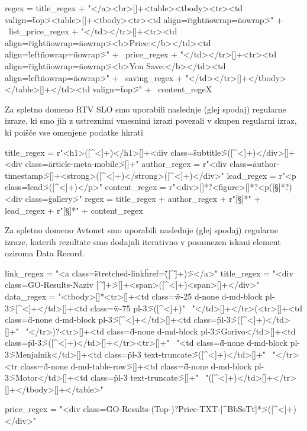 \documentclass[conference]{IEEEtran}
\begin{document}
	regex = title_regex + "</a><br>[\s]+<table><tbody><tr><td 
	valign=\"top\"><table>[\s]+<tbody><tr><td align=\"right\" nowrap=\"nowrap\">" + \
	list_price_regex + "</td></tr>[\s]+<tr><td align=\"right\"
	nowrap=\"nowrap\"><b>Price:</b></td><td align=\"left\" nowrap=\"nowrap\">" + \
	price_regex + "</td></tr>[\s]+<tr><td align=\"right\" nowrap=\"nowrap\"><b>You 
	Save:</b></td><td align=\"left\" nowrap=\"nowrap\">" + aving_regex + "</td></tr>[\s]+</tbody></table>[\s]+</td><td valign=\"top\">" + \
	content_regeX

	Za spletno domeno RTV SLO smo uporabili naslednje (glej spodaj) regularne izraze, ki smo jih z ustreznimi vmesnimi izrazi povezali v skupen regularni izraz, ki poišče vse omenjene podatke hkrati

	title_regex = r"<h1>([^<]+)</h1>[\s]+<div class=\"subtitle\">([^<]+)</div>[\s]+<div class=\"article-meta-mobile\">[\s]+"
	author_regex = r"<div class=\"author-timestamp\">[\s]+<strong>([^<]+)</strong>([^<]+)</div>"
	lead_regex = r"<p class=\"lead\">([^<]+)</p>"
	content_regex = r"<\/div>[\s]*?<\/figure>[\s]*?<p([\s\S]*?)<div class=\"gallery\">"
	regex = title_regex + author_regex + r"[\s\S]*" + lead_regex + r"[\s\S]*" + content_regex

			
			
	Za spletno domeno Avtonet smo uporabili naslednje (glej spodaj) regularne izraze, katerih rezultate smo dodajali iterativno v posamezen iskani element oziroma Data Record.
			
	link_regex = "<a class=\"stretched-link\" href=\"([^\"]+)\"></a>"
	title_regex = "<div class=\"GO-Results-Naziv [^\"]+\">[\s]+<span>([^<]+)<\/span>[\s]+</div>"
	data_regex = "<tbody>[\s]*<tr>[\s]+<td class=\"w-25 d-none d-md-block pl-3\">[^<]+</td>[\s]+<td class=\"w-75 pl-3\">([^<]+)" \
				"</td>[\s]+</tr>(<tr>[\s]+<td class=\"d-none d-md-block pl-3\">[^<]+</td>[\s]+<td class=\"pl-3\">([^<]+)</td>[\s]+" \
				"</tr>)?<tr>[\s]+<td class=\"d-none d-md-block pl-3\">Gorivo</td>[\s]+<td class=\"pl-3\">([^<]+)</td>[\s]+</tr><tr>[\s]+" \
				"<td class=\"d-none d-md-block pl-3\">Menjalnik</td>[\s]+<td class=\"pl-3 text-truncate\">([^<]+)</td>[\s]+" \
				"</tr><tr class=\"d-none d-md-table-row\">[\s]+<td class=\"d-none d-md-block pl-3\">Motor</td>[\s]+<td class=\"pl-3 text-truncate\">[\s]+" \
				"([^<]+)</td>[\s]+</tr>[\s]+</tbody>[\s]+</table>"

	price_regex = "<div class=\"GO-Results-(Top-)?Price-TXT-[^BbSsTt\"]*\">([^<]+)</div>"

	
\end{document}
